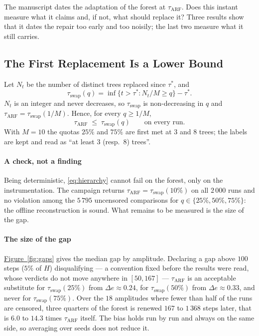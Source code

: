 \documentclass[10pt,conference]{IEEEtran}
\theoremstyle{definition}
\begin{document}
The manuscript dates the adaptation of the forest at $\tau_{\mathrm{ARF}}$. Does this instant
measure what it claims and, if not, what should replace it? Three results show that it dates the repair too early and too
noisily; the last two measure what it still carries.

\subsection{The First Replacement Is a Lower Bound}
\label{sec:hierarchy}

Let $N_t$ be the number of distinct trees replaced since $\tau^*$, and
\[
  \tau_{\mathrm{swap}}(q) = \inf\{t > \tau^* : N_t/M \ge q\} - \tau^* .
\]
$N_t$ is an integer and never decreases, so $\tau_{\mathrm{swap}}$ is non-decreasing in
$q$ and $\tau_{\mathrm{ARF}} = \tau_{\mathrm{swap}}(1/M)$. Hence, for every $q \ge 1/M$,
\begin{equation}
  \tau_{\mathrm{ARF}} \;\le\; \tau_{\mathrm{swap}}(q) \qquad \text{on every run.}
  \label{eq:hierarchy}
\end{equation}
With $M = 10$ the quotas $25\%$ and $75\%$ are first met at $3$ and $8$ trees; the labels
are kept and read as ``at least $3$ (resp.\ $8$) trees''.

\paragraph{A check, not a finding} Being deterministic, \eqref{eq:hierarchy} cannot fail
on the forest, only on the instrumentation. The campaign returns
$\tau_{\mathrm{ARF}} = \tau_{\mathrm{swap}}(10\%)$ on all $2\,000$ runs and no violation
among the $5\,795$ uncensored comparisons for $q \in \{25\%, 50\%, 75\%\}$: the offline
reconstruction is sound. What remains to be measured is the size of the gap.

\paragraph{The size of the gap} \hyperref[fig:gaps]{Figure~\ref*{fig:gaps}} gives the median gap by amplitude.
Declaring a gap above $100$ steps ($5\%$ of $H$) disqualifying --- a convention fixed before
the results were read, whose verdicts do not move anywhere in $[50, 167]$ ---
$\tau_{\mathrm{ARF}}$ is an acceptable substitute for $\tau_{\mathrm{swap}}(25\%)$ from
$\Delta e \approx 0.24$, for $\tau_{\mathrm{swap}}(50\%)$ from $\Delta e \approx 0.33$, and
never for $\tau_{\mathrm{swap}}(75\%)$. Over the $18$ amplitudes where fewer than half of
the runs are censored, three quarters of the forest is renewed $167$ to $1\,368$ steps
later, that is $6.0$ to $14.3$ times $\tau_{\mathrm{ARF}}$ itself. The bias holds run by
run and always on the same side, so averaging over seeds does not reduce it.
\end{document}
